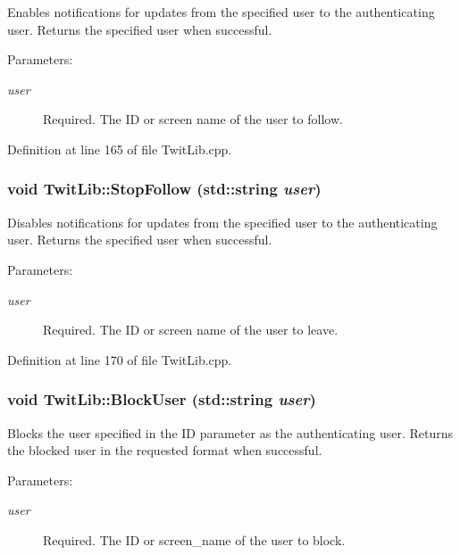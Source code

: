 Enables notifications for updates from the specified user to the authenticating user. Returns the specified user when successful. \begin{Desc}
\item[Parameters:]
\begin{description}
\item[{\em user}]Required. The ID or screen name of the user to follow. \end{description}
\end{Desc}


Definition at line 165 of file TwitLib.cpp.\hypertarget{classTwitLib_955be6b8ee764e6348e70a055c07c18d}{
\subsubsection{\setlength{\rightskip}{0pt plus 5cm}void TwitLib::StopFollow (std::string {\em user})}}
\label{classTwitLib_955be6b8ee764e6348e70a055c07c18d}


Disables notifications for updates from the specified user to the authenticating user. Returns the specified user when successful. \begin{Desc}
\item[Parameters:]
\begin{description}
\item[{\em user}]Required. The ID or screen name of the user to leave. \end{description}
\end{Desc}


Definition at line 170 of file TwitLib.cpp.\hypertarget{classTwitLib_bc66b89dd482ef5407a045e2f8f4709b}{
\subsubsection{\setlength{\rightskip}{0pt plus 5cm}void TwitLib::BlockUser (std::string {\em user})}}
\label{classTwitLib_bc66b89dd482ef5407a045e2f8f4709b}


Blocks the user specified in the ID parameter as the authenticating user. Returns the blocked user in the requested format when successful. \begin{Desc}
\item[Parameters:]
\begin{description}
\item[{\em user}]Required. The ID or screen\_\-name of the user to block. \end{description}
\end{Desc}


